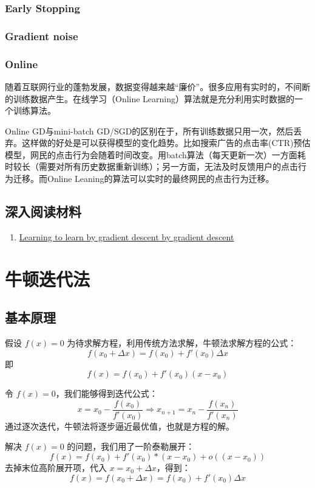 \documentclass[a4paper,10pt]{ctexbook}
\begin{document}
\subsubsection{Early Stopping}
\subsubsection{Gradient noise}


\subsubsection{Online}
随着互联网行业的蓬勃发展，数据变得越来越``廉价''。很多应用有实时的，不间断的训练数据产生。在线学习（Online Learning）算法就是充分利用实时数据的一个训练算法。

Online GD与mini-batch GD/SGD的区别在于，所有训练数据只用一次，然后丢弃。这样做的好处是可以获得模型的变化趋势。比如搜索广告的点击率(CTR)预估模型，网民的点击行为会随着时间改变。用batch算法（每天更新一次）一方面耗时较长（需要对所有历史数据重新训练）；另一方面，无法及时反馈用户的点击行为迁移。而Online Leaning的算法可以实时的最终网民的点击行为迁移。

\subsection{深入阅读材料}
\begin{enumerate}
    \item \href{https://arxiv.org/abs/1606.04474}{Learning to learn by gradient descent by gradient descent}
\end{enumerate}






\section{牛顿迭代法}
\subsection{基本原理}
假设 $f(x) = 0$ 为待求解方程，利用传统方法求解，牛顿法求解方程的公式：
\[
f(x_0 + \Delta x) = f(x_0) + f'(x_0)\Delta x
\]
即
\[
    f(x) = f(x_0) + f'(x_0)(x - x_0)
\]

令 $f(x) = 0$，我们能够得到迭代公式：
\[
    x = x_0 - \frac{f(x_0)}{f'(x_0)} \Rightarrow x_{n+1} = x_n - \frac{f(x_n)}{f'(x_n)}
\]
通过逐次迭代，牛顿法将逐步逼近最优值，也就是方程的解。

解决 $f(x) = 0$ 的问题，我们用了一阶泰勒展开：
\[
    f(x) = f(x_0) + f'(x_0)*(x-x_0) + o((x-x_0))
\]
去掉末位高阶展开项，代入 $x = x_0 + \Delta x$，得到：
\[
    f(x) = f(x_0 + \Delta x) = f(x_0) + f'(x_0)\Delta x
\]
\end{document}
